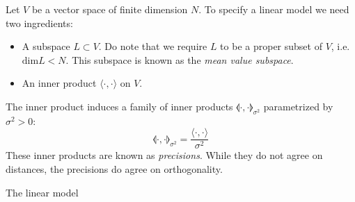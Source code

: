 \documentclass[12pt, a4paper]{article}
\begin{document}
Let $V$ be a vector space of finite dimension $N$. To specify a linear model we need two ingredients:
\begin{itemize}
\item A subspace $L\subset V$. Do note that we require $L$ to be a proper subset of $V$, i.e. $\textrm{dim}L<N$. This subspace is known as the \textit{mean value subspace}.
\item An inner product $\langle\cdot,\cdot\rangle$ on $V$.
\end{itemize}
The inner product induces a family of inner products $\llangle\cdot,\cdot\rrangle_{\sigma^2}$ parametrized by $\sigma^2>0$:
\begin{equation}
\llangle\cdot,\cdot\rrangle_{\sigma^2}=\frac{\langle\cdot,\cdot\rangle}{\sigma^2}
\end{equation}
These inner products are known as \textit{precisions}. While they do not agree on distances, the precisions do agree on orthogonality.

The linear model
\end{document}
